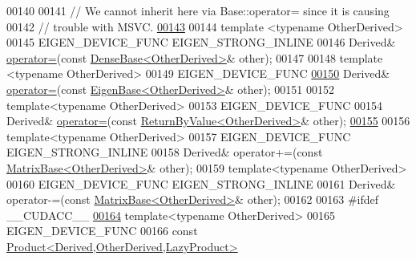 \begin{DoxyCode}
00140 
00141     \textcolor{comment}{// We cannot inherit here via Base::operator= since it is causing}
00142     \textcolor{comment}{// trouble with MSVC.}
\hyperlink{group___core___module_a302dec31d512edd5781f059c08e3179c}{00143} 
00144     \textcolor{keyword}{template} <\textcolor{keyword}{typename} OtherDerived>
00145     EIGEN\_DEVICE\_FUNC EIGEN\_STRONG\_INLINE
00146     Derived& \hyperlink{group___core___module_a706a4dd1ee54786e9210de1a4bf02600}{operator=}(\textcolor{keyword}{const} \hyperlink{group___core___module_class_eigen_1_1_dense_base}{DenseBase<OtherDerived>}& other);
00147 
00148     \textcolor{keyword}{template} <\textcolor{keyword}{typename} OtherDerived>
00149     EIGEN\_DEVICE\_FUNC
\hyperlink{group___core___module_a5e61bcee01dbdae901280f363610f0e3}{00150}     Derived& \hyperlink{group___core___module_a706a4dd1ee54786e9210de1a4bf02600}{operator=}(\textcolor{keyword}{const} \hyperlink{group___core___module_struct_eigen_1_1_eigen_base}{EigenBase<OtherDerived>}& other);
00151 
00152     \textcolor{keyword}{template}<\textcolor{keyword}{typename} OtherDerived>
00153     EIGEN\_DEVICE\_FUNC
00154     Derived& \hyperlink{group___core___module_a706a4dd1ee54786e9210de1a4bf02600}{operator=}(\textcolor{keyword}{const} \hyperlink{group___core___module_class_eigen_1_1_return_by_value}{ReturnByValue<OtherDerived>}& other);
\hyperlink{group___core___module_a1738254da7bde8e46bb50b47a60adff0}{00155} 
00156     \textcolor{keyword}{template}<\textcolor{keyword}{typename} OtherDerived>
00157     EIGEN\_DEVICE\_FUNC EIGEN\_STRONG\_INLINE
00158     Derived& operator+=(\textcolor{keyword}{const} \hyperlink{group___core___module_class_eigen_1_1_matrix_base}{MatrixBase<OtherDerived>}& other);
00159     \textcolor{keyword}{template}<\textcolor{keyword}{typename} OtherDerived>
00160     EIGEN\_DEVICE\_FUNC EIGEN\_STRONG\_INLINE
00161     Derived& operator-=(\textcolor{keyword}{const} \hyperlink{group___core___module_class_eigen_1_1_matrix_base}{MatrixBase<OtherDerived>}& other);
00162 
00163 \textcolor{preprocessor}{#ifdef \_\_CUDACC\_\_}
\hyperlink{group___core___module_aa60c37d8bb4139f7254d4fb9e2cebb68}{00164}     \textcolor{keyword}{template}<\textcolor{keyword}{typename} OtherDerived>
00165     EIGEN\_DEVICE\_FUNC
00166     \textcolor{keyword}{const} \hyperlink{group___core___module_class_eigen_1_1_product}{Product<Derived,OtherDerived,LazyProduct>}

\end{DoxyCode}

